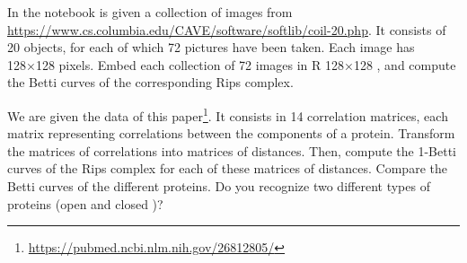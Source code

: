 \noindent\linia

\begin{exercise}
    In the notebook is given a collection of images from
    \url{https://www.cs.columbia.edu/CAVE/software/softlib/coil-20.php}. It
    consists of 20 objects, for each of which 72 pictures have been taken.
    Each image has 128×128 pixels. Embed each collection of 72 images in R
    128×128 , and compute the Betti curves of the corresponding Rips complex.
\end{exercise}

\noindent\linia

\begin{exercise}
    We are given the data of this
    paper\footnote{\url{https://pubmed.ncbi.nlm.nih.gov/26812805/}}. It
    consists in 14 correlation matrices, each matrix representing correlations
    between the components of a protein. Transform the matrices of
    correlations into matrices of distances. Then, compute the 1-Betti curves
    of the Rips complex for each of these matrices of distances. Compare the
    Betti curves of the different proteins. Do you recognize two different
    types of proteins (open and closed )?
\end{exercise}